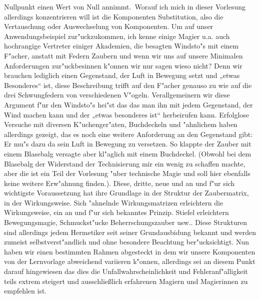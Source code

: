 \documentclass[a5paper,8pt]{book}
\begin{document}
Nullpunkt einen Wert von Null annimmt.\
Worauf ich mich in dieser Vorlesung allerdings konzentrieren will ist die Komponenten Substitution, also 
die Vertauschung oder Auswechselung von Komponenten.
Um auf unser Anwendungsbeispiel zur"uckzukommen, ich kenne einige Magier u.a. auch hochrangige Vertreter 
einiger Akademien, die besagten Windsto"s mit einem F"acher, anstatt mit Federn Zaubern und wenn wir uns auf unsere Minimalen Anforderungen zur"uckbesinnen k"onnen wir nur 
sagen wieso nicht? Denn wir brauchen lediglich einen Gegenstand, der Luft in Bewegung setzt und „etwas Besonderes“ ist, diese Beschreibung trifft auf den F"acher genauso zu 
wie auf die drei Schwungfedern von verschiedenen V"ogeln. Verallgemeinern wir diese Argument f"ur den Windsto"s hei"st das das man ihn mit jedem Gegenstand, der Wind machen 
kann und der „etwas besonderes ist“ herbeirufen kann. Erfolglose Versuche mit diversen K"uchenger"aten, Buchdeckeln und "ahnlichem haben allerdings gezeigt, das es noch 
eine weitere Anforderung an den Gegenstand gibt: Er mu"s dazu da sein Luft in Bewegung zu versetzen. So klappte der Zauber mit einem Blasebalg versagte aber kl"aglich mit 
einem Buchdeckel. (Obwohl bei dem Blasebalg der Widerstand 
der Technisierung mir ein wenig zu schaffen machte, aber die ist ein Teil der Vorlesung "uber technische Magie 
und soll hier ebenfalls keine weitere Erw"ahnung finden.). Diese, dritte, neue und an und f"ur sich wichtigste Voraussetzung hat ihre Grundlage in der Struktur der 
Zaubermatrix, in der Wirkungsweise. Sich "ahnelnde Wirkungsmatrizen erleichtern die Wirkungsweise, ein an und f"ur sich bekanntes Prinzip. Stiefel erleichtern 
Bewegungsmagie, Schmuckst"ucke Beherrschungszauber usw.. Diese Strukturen sind allerdings jedem Hermetiker seit seiner Grundausbidung bekannt und werden zumeist 
selbstverst"andlich und ohne besondere Beachtung ber"ucksichtigt.
Nun haben wir einen bestimmten Rahmen abgesteckt in dem wir unsere Komponenten von der Lernvorlage abweichend variieren k"onnen, allerdings sei an diesem Punkt darauf 
hingewiesen das dies die Unfallwahrscheinlichkeit und Fehleranf"alligkeit teils extrem steigert und ausschließlich erfahrenen Magiern und Magierinnen zu empfehlen ist.\\
\end{document}
